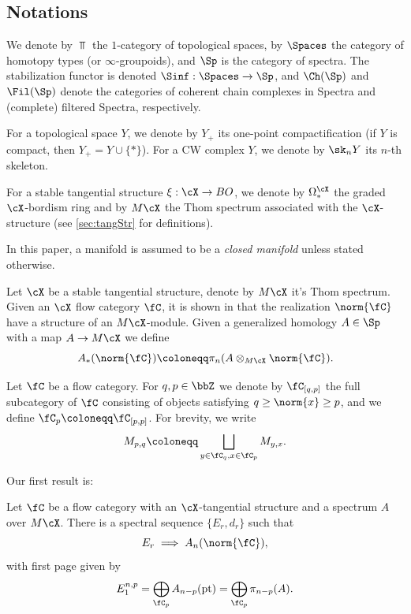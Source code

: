 \subsection*{Notations}
We denote by $\Top$ the $1$-category of topological spaces, by $\Spaces$ the category of homotopy types (or $\infty$-groupoids), and $\Sp$ is the category of spectra. The stabilization functor is denoted $\Sinf: \Spaces \to \Sp$, and $\Ch(\Sp)$ and $\Fil(\Sp)$ denote the categories of coherent chain complexes in Spectra and (complete) filtered Spectra, respectively.

For a topological space $Y$, we denote by $Y_+$ its one-point compactification (if $Y$ is compact, then $Y_+ = Y \cup \{*\}$).
For a CW complex $Y$, we denote by $\sk_n Y$ its $n$-th skeleton.

For a stable tangential structure $\xi: \cX \to BO$, we denote by $\Omega^{\cX}_*$ the graded $\cX$-bordism ring and by $M\cX$ the Thom spectrum associated with the $\cX$-structure (see \cref{sec:tangStr} for definitions).

In this paper, a manifold is assumed to be a \emph{closed manifold} unless stated otherwise.

 Let $\cX$ be a stable tangential structure, denote by $M\cX$ it's Thom spectrum. Given an $\cX$ flow category $\fC$, it is shown in \cite{Cohen19} that the realization $\norm{\fC}$ have a structure of an $M\cX$-module. Given a generalized homology $A \in \Sp$ with a map $A \to M\cX$ we define 
 \[
    A_*(\norm{\fC}) \coloneqq \pi_n(A \otimes_{M\cX} \norm{\fC}).
 \]

 Let $\fC$ be a flow category. For $q,p \in \bbZ$ we denote by $\fC_{[q,p]}$ the full subcategory of $\fC$ consisting of objects satisfying $q \ge \norm{x}\ge p$, and we define $\fC_p \coloneqq \fC_{[p,p]}$. For brevity, we write
\begin{equation*}
    M_{p,q}\coloneqq \bigsqcup_{y \in \fC_q, x \in \fC_p} M_{y,x}.
\end{equation*}

 Our first result is: 
 \begin{thm}
    Let $\fC$ be a flow category with an $\cX$-tangential structure and a spectrum $A$ over $M\cX$. There is a spectral sequence $\{E_r,d_r\}$ such that
    \begin{equation*}
        E_r \implies A_n(\norm{\fC}),
    \end{equation*}
    with first page given by
    \begin{equation*}
        E_1^{n,p} = \bigoplus_{\fC_p} A_{n-p}(\mathrm{pt}) = \bigoplus_{\fC_p} \pi_{n-p}(A).
    \end{equation*}
 \end{thm}

